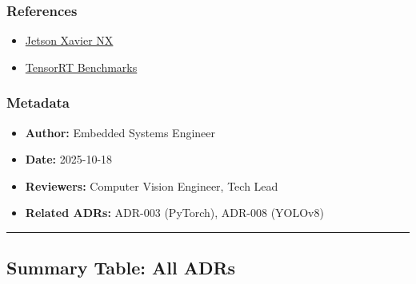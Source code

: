 \documentclass[
]{article}
\providecommand{\tightlist}{%
  \setlength{\itemsep}{0pt}\setlength{\parskip}{0pt}}
\begin{document}
\hypertarget{references-14}{%
\subsubsection{References}\label{references-14}}

\begin{itemize}
\tightlist
\item
  \href{https://www.nvidia.com/en-us/autonomous-machines/embedded-systems/jetson-xavier-nx/}{Jetson
  Xavier NX}
\item
  \href{https://developer.nvidia.com/tensorrt}{TensorRT Benchmarks}
\end{itemize}

\hypertarget{metadata-14}{%
\subsubsection{Metadata}\label{metadata-14}}

\begin{itemize}
\tightlist
\item
  \textbf{Author:} Embedded Systems Engineer
\item
  \textbf{Date:} 2025-10-18
\item
  \textbf{Reviewers:} Computer Vision Engineer, Tech Lead
\item
  \textbf{Related ADRs:} ADR-003 (PyTorch), ADR-008 (YOLOv8)
\end{itemize}

\begin{center}\rule{0.5\linewidth}{0.5pt}\end{center}

\hypertarget{summary-table-all-adrs}{%
\subsection{Summary Table: All ADRs}\label{summary-table-all-adrs}}
\end{document}
